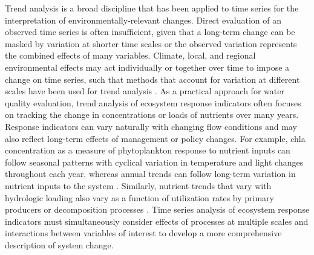\documentclass[journal = esthag, manuscript = article]{achemso}\usepackage[]{graphicx}\usepackage[]{color}
\begin{document}
Trend analysis is a broad discipline that has been applied to time series for the interpretation of environmentally-relevant changes.  Direct evaluation of an observed time series is often insufficient, given that a long-term change can be masked by variation at shorter time scales or the observed variation represents the combined effects of many variables\cite{Oneill89,Levin92}. Climate, local, and regional environmental effects may act individually or together over time to impose a change on time series, such that methods that account for variation at different scales have been used for trend analysis \cite{Bhangu97,Champely97,Chang08,Halliday12}.  As a practical approach for water quality evaluation, trend analysis of ecosystem response indicators often focuses on tracking the change in concentrations or loads of nutrients over many years. Response indicators can vary naturally with changing flow conditions and may also reflect long-term effects of management or policy changes. For example, \ac{chla} concentration as a measure of phytoplankton response to nutrient inputs can follow seasonal patterns with cyclical variation in temperature and light changes throughout each year, whereas annual trends can follow long-term variation in nutrient inputs to the system \cite{Cloern96,Cloern10}. Similarly, nutrient trends that vary with hydrologic loading also vary as a function of utilization rates by primary producers or decomposition processes \cite{Sakamoto89,Schultz08,Harding16}. Time series analysis of ecosystem response indicators must simultaneously consider effects of processes at multiple scales and interactions between variables of interest to develop a more comprehensive description of system change. 
\end{document}
